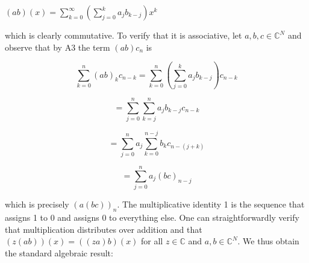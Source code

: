 $(ab)(x) = \sum_{k=0}^{\infty} \left( \sum_{j=0}^{k} a_j b_{k-j} \right) x^k$

which is clearly commutative. To verify that it is associative, let $a, b, c \in \mathbb{C}^N$ and observe that by A3 the term $(ab)c_n$ is

$$\sum_{k=0}^{n} (ab)_k c_{n-k} = \sum_{k=0}^{n} \left( \sum_{j=0}^{k} a_j b_{k-j} \right) c_{n-k}$$

$$= \sum_{j=0}^{n} \sum_{k=j}^{n} a_j b_{k-j} c_{n-k}$$

$$= \sum_{j=0}^{n} a_j \sum_{k=0}^{n-j} b_k c_{n-(j+k)}$$

$$= \sum_{j=0}^{n} a_j (bc)_{n-j}$$

which is precisely $(a(bc))_n$. The multiplicative identity 1 is the sequence that assigns 1 to 0 and assigns 0 to everything else. One can straightforwardly verify that multiplication distributes over addition and that $(z(ab))(x) = ((za)b)(x)$ for all $z \in \mathbb{C}$ and $a, b \in \mathbb{C}^N$. We thus obtain the standard algebraic result:
